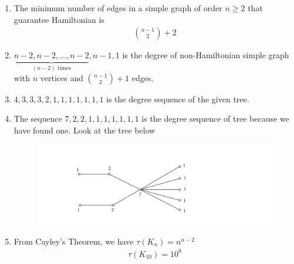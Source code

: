 \documentclass[paper=a4, fontsize=11pt,twoside]{scrartcl}		%
\theoremstyle{definition}
\theoremstyle{remark}
\begin{document}
\begin{enumerate}
  (b) The above $G_1$ and $G_2$ can't be Hamiltonian. Because removing the indicated vertices in \textcolor{red}{red} will result the number of component that exceed the number of vertices, which we've just removed. i.e. For $G_1$, take $S=\{a\}$\\
  \begin{align*}
  \Rightarrow |\omega(G_1-S)|=2\geq|S|=1
  \end{align*}
  For $G_2$, take $S=\{a,b\}$
  \begin{align*}
  \Rightarrow|\omega(G_2-S)|=3\geq2=|S|
  \end{align*}
  (c) The degree sequence of $G_1$ is; $1,4,4,4,4,5$ and \\
  The degree sequence of $G_2$ is; $5,5,3,3,2,2$\\
  (d) NO! It's impossible(Because of Chvatal's Theorem).

  \item The minimum number of edges in a simple graph of order $n\geq2$ that guarantee Hamiltonian is
  \begin{align*}
  \binom{n-1}{2}+2
  \end{align*}
  \item $\underbrace{n-2,n-2,\ldots,n-2}_{(n-2) \text{ times}},n-1,1$ is the degree of non-Hamiltonian simple graph with $n$ vertices and $\binom{n-1}{2}+1$ edges.
  \item $4,3,3,3,2,1,1,1,1,1,1,1$ is the degree sequence of the given tree.
  \newpage

  \item The sequence $7,2,2,1,1,1,1,1,1,1$ is the degree sequence of tree because we have found one. Look at the tree below
  \begin{figure}[hbt!]
\centering
\includegraphics[width=1.0\textwidth]{SolGrapAssp5.png}
\end{figure}


  \item From Cayley's Theorem, we have $\tau(K_n)=n^{n-2}$
  \begin{align*}
  \tau(K_{10})=10^8
  \end{align*}


\end{enumerate}
\end{document}
